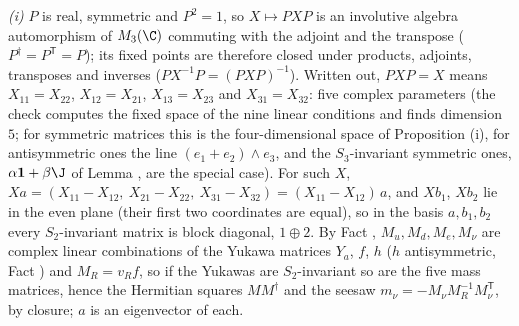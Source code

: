 \emph{(i)} $P$ is real, symmetric and $P^{2} = 1$, so $X \mapsto PXP$ is an involutive algebra automorphism of $M_{3}(\C)$ commuting with the adjoint and the transpose ($P^{\dagger} = P^{\mathsf T} = P$); its fixed points are therefore closed under products, adjoints, transposes and inverses ($PX^{-1}P = (PXP)^{-1}$). Written out, $PXP = X$ means $X_{11} = X_{22}$, $X_{12} = X_{21}$, $X_{13} = X_{23}$ and $X_{31} = X_{32}$: five complex parameters (the check computes the fixed space of the nine linear conditions and finds dimension $5$; for symmetric matrices this is the four-dimensional space of Proposition (i), for antisymmetric ones the line $(e_{1} + e_{2})\wedge e_{3}$, and the $S_{3}$-invariant symmetric ones, $\alpha\mathbf 1 + \beta\J$ of Lemma , are the special case). For such $X$, $Xa = (X_{11} - X_{12},\ X_{21} - X_{22},\ X_{31} - X_{32}) = (X_{11} - X_{12})\,a$, and $Xb_{1}$, $Xb_{2}$ lie in the even plane (their first two coordinates are equal), so in the basis $a, b_{1}, b_{2}$ every $S_{2}$-invariant matrix is block diagonal, $1 \oplus 2$. By Fact , $M_{u}, M_{d}, M_{e}, M_{\nu}$ are complex linear combinations of the Yukawa matrices $Y_{a}$, $f$, $h$ ($h$ antisymmetric, Fact ) and $M_{R} = v_{R}f$, so if the Yukawas are $S_{2}$-invariant so are the five mass matrices, hence the Hermitian squares $MM^{\dagger}$ and the seesaw $m_{\nu} = -M_{\nu}M_{R}^{-1}M_{\nu}^{\mathsf T}$, by closure; $a$ is an eigenvector of each.

